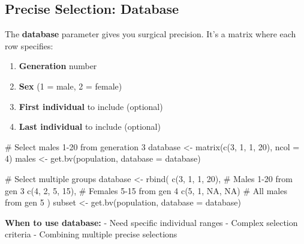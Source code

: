 \documentclass[
  letterpaper,
]{book}
\newenvironment{Shaded}{\begin{snugshade}}{\end{snugshade}}
\newcommand{\AttributeTok}[1]{\textcolor[rgb]{0.40,0.45,0.13}{#1}}
\newcommand{\CommentTok}[1]{\textcolor[rgb]{0.37,0.37,0.37}{#1}}
\newcommand{\ConstantTok}[1]{\textcolor[rgb]{0.56,0.35,0.01}{#1}}
\newcommand{\DecValTok}[1]{\textcolor[rgb]{0.68,0.00,0.00}{#1}}
\newcommand{\FunctionTok}[1]{\textcolor[rgb]{0.28,0.35,0.67}{#1}}
\newcommand{\NormalTok}[1]{\textcolor[rgb]{0.00,0.23,0.31}{#1}}
\newcommand{\OtherTok}[1]{\textcolor[rgb]{0.00,0.23,0.31}{#1}}
\providecommand{\tightlist}{%
  \setlength{\itemsep}{0pt}\setlength{\parskip}{0pt}}
\begin{document}
\subsection{Precise Selection: Database}\label{sec-database}

The \textbf{database} parameter gives you surgical precision. It's a
matrix where each row specifies:

\begin{enumerate}
\def\labelenumi{\arabic{enumi}.}
\tightlist
\item
  \textbf{Generation} number
\item
  \textbf{Sex} (1 = male, 2 = female)
\item
  \textbf{First individual} to include (optional)
\item
  \textbf{Last individual} to include (optional)
\end{enumerate}

\begin{Shaded}
\begin{Highlighting}[]
\CommentTok{\# Select males 1{-}20 from generation 3}
\NormalTok{database }\OtherTok{\textless{}{-}} \FunctionTok{matrix}\NormalTok{(}\FunctionTok{c}\NormalTok{(}\DecValTok{3}\NormalTok{, }\DecValTok{1}\NormalTok{, }\DecValTok{1}\NormalTok{, }\DecValTok{20}\NormalTok{), }\AttributeTok{ncol =} \DecValTok{4}\NormalTok{)}
\NormalTok{males }\OtherTok{\textless{}{-}} \FunctionTok{get.bv}\NormalTok{(population, }\AttributeTok{database =}\NormalTok{ database)}

\CommentTok{\# Select multiple groups}
\NormalTok{database }\OtherTok{\textless{}{-}} \FunctionTok{rbind}\NormalTok{(}
  \FunctionTok{c}\NormalTok{(}\DecValTok{3}\NormalTok{, }\DecValTok{1}\NormalTok{, }\DecValTok{1}\NormalTok{, }\DecValTok{20}\NormalTok{),    }\CommentTok{\# Males 1{-}20 from gen 3}
  \FunctionTok{c}\NormalTok{(}\DecValTok{4}\NormalTok{, }\DecValTok{2}\NormalTok{, }\DecValTok{5}\NormalTok{, }\DecValTok{15}\NormalTok{),    }\CommentTok{\# Females 5{-}15 from gen 4}
  \FunctionTok{c}\NormalTok{(}\DecValTok{5}\NormalTok{, }\DecValTok{1}\NormalTok{, }\ConstantTok{NA}\NormalTok{, }\ConstantTok{NA}\NormalTok{)    }\CommentTok{\# All males from gen 5}
\NormalTok{)}
\NormalTok{subset }\OtherTok{\textless{}{-}} \FunctionTok{get.bv}\NormalTok{(population, }\AttributeTok{database =}\NormalTok{ database)}
\end{Highlighting}
\end{Shaded}

\textbf{When to use database:} - Need specific individual ranges -
Complex selection criteria - Combining multiple precise selections
\end{document}
